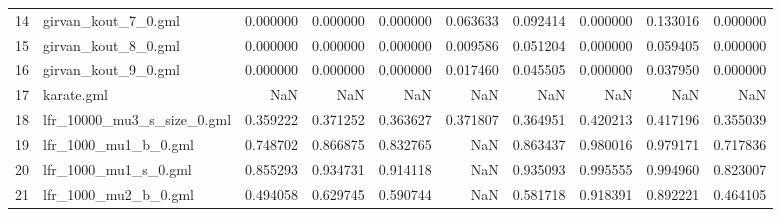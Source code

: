 \begin{tabular}{llrrrrrrrr}
14 &         girvan\_kout\_7\_0.gml &                            0.000000 &                       0.000000 &                          0.000000 &                      0.063633 &                        0.092414 &                     0.000000 &                            0.133016 &                                0.000000 \\
15 &         girvan\_kout\_8\_0.gml &                            0.000000 &                       0.000000 &                          0.000000 &                      0.009586 &                        0.051204 &                     0.000000 &                            0.059405 &                                0.000000 \\
16 &         girvan\_kout\_9\_0.gml &                            0.000000 &                       0.000000 &                          0.000000 &                      0.017460 &                        0.045505 &                     0.000000 &                            0.037950 &                                0.000000 \\
17 &                  karate.gml &                                 NaN &                            NaN &                               NaN &                           NaN &                             NaN &                          NaN &                                 NaN &                                     NaN \\
18 &  lfr\_10000\_mu3\_s\_size\_0.gml &                            0.359222 &                       0.371252 &                          0.363627 &                      0.371807 &                        0.364951 &                     0.420213 &                            0.417196 &                                0.355039 \\
19 &        lfr\_1000\_mu1\_b\_0.gml &                            0.748702 &                       0.866875 &                          0.832765 &                           NaN &                        0.863437 &                     0.980016 &                            0.979171 &                                0.717836 \\
20 &        lfr\_1000\_mu1\_s\_0.gml &                            0.855293 &                       0.934731 &                          0.914118 &                           NaN &                        0.935093 &                     0.995555 &                            0.994960 &                                0.823007 \\
21 &        lfr\_1000\_mu2\_b\_0.gml &                            0.494058 &                       0.629745 &                          0.590744 &                           NaN &                        0.581718 &                     0.918391 &                            0.892221 &                                0.464105 \\

\end{tabular}
